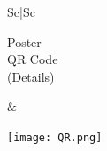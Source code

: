 \documentclass[a1paper,portrait,margin=0.8cm]{baposter}
\begin{document}
\begin{poster}
{\begin{minipage}[b]{0.4\textwidth}
\end{minipage}
\hfill
\begin{minipage}[b]{0.5\textwidth}
    
\begin{tabular}{S{c}|S{c}}

\begin{minipage}[t]{0.5\textwidth}
\vspace{-0.1em}
\centering
\hspace{0.4em} Poster \\ 
\hspace{0.4em} QR Code \\
\hspace{0.4em} (Details)
\end{minipage}
&
\begin{minipage}[t]{0.4\textwidth}
\vspace{-1em}
\texttt{[image: QR.png]}
\end{minipage}

\end{tabular}

\end{minipage}
}



\end{poster}
\end{document}
